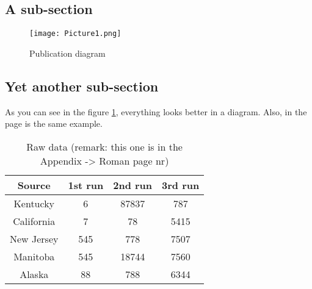 \subsection{A sub-section}
\begin{figure}[h]
    \centering
    \texttt{[image: Picture1.png]}
    \caption{Publication diagram}
    \label{fig:mesh1}
\end{figure}

\subsection{Yet another sub-section}
As you can see in the figure \ref{fig:mesh1}, everything looks better in a diagram. Also, in the page \pageref{fig:mesh1} 
is the same example.


\begin{table}[h!]
\centering
\begin{tabular}{|c|c|c|c|} 
 \hline
Source & 1st run & 2nd run & 3rd run \\ [0.5ex] 
 \hline
 Kentucky & 6 & 87837 & 787 \\ 
 \hline
 California & 7 & 78 & 5415 \\
 \hline
 New Jersey & 545 & 778 & 7507 \\
 \hline
 Manitoba & 545 & 18744 & 7560 \\
 \hline
 Alaska & 88 & 788 & 6344 \\ 
 \hline
\end{tabular}
\caption{Raw data (remark: this one is in the Appendix -> Roman page nr)}
\label{table:raw_data}
\end{table}